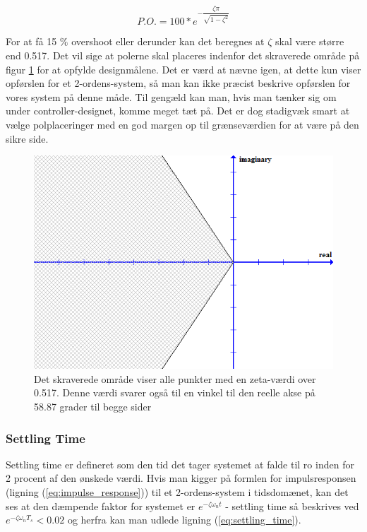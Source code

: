 \begin{equation}\label{eq:P.O.}
P.O.=100*e^{-\dfrac{\zeta\pi}{\sqrt{1-\zeta^2}}}
\end{equation}

For at få 15 $\%$ overshoot eller derunder kan det beregnes at $\zeta$ skal være større end 0.517. Det vil sige at polerne skal placeres indenfor det skraverede område på figur \ref{fig:Overshoot} for at opfylde designmålene. Det er værd at nævne igen, at dette kun viser opførslen for et 2-ordens-system, så man kan ikke præcist beskrive opførslen for vores system på denne måde. Til gengæld kan man, hvis man tænker sig om under controller-designet, komme meget tæt på. Det er dog stadigvæk smart at vælge polplaceringer med en god margen op til grænseværdien for at være på den sikre side.

\begin{figure}[ht]
	\begin{center}
		\includegraphics[scale=0.5]{Billeder/Overshoot.PNG}
	\end{center}
\caption{Det skraverede område viser alle punkter med en zeta-værdi over 0.517. Denne værdi svarer også til en vinkel til den reelle akse på 58.87 grader til begge sider}
\label{fig:Overshoot}
\end{figure}

\subsubsection{Settling Time}

Settling time er defineret som den tid det tager systemet at falde til ro inden for 2 procent af den ønskede værdi. Hvis man kigger på formlen for impulsresponsen (ligning (\ref{eq:impulse_response}))  til et 2-ordens-system i tidsdomænet, kan det ses at den dæmpende faktor for systemet er $e^{-\zeta\omega_{n}t}$ - settling time så beskrives ved $e^{-\zeta\omega_{n}T_{s}}<0.02$ og herfra kan man udlede ligning (\ref{eq:settling_time}).

